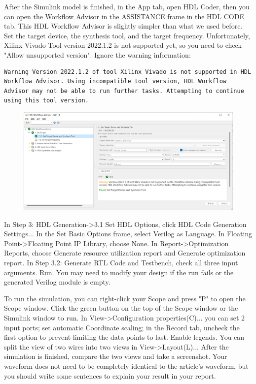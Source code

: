 \documentclass[a4paper,12pt,twoside]{article}
\begin{document}
After the Simulink model is finished, in the App tab, open HDL Coder, then you can open the Workflow Advisor in the ASSISTANCE frame in the HDL CODE tab. This HDL Workflow Advisor is slightly simpler than what we used before. Set the target device, the synthesis tool, and the target frequency. Unfortunately, Xilinx Vivado Tool version 2022.1.2 is not supported yet, so you need to check "Allow unsupported version". Ignore the warning information:
\begin{verbatim}
Warning Version 2022.1.2 of tool Xilinx Vivado is not supported in HDL Workflow Advisor. Using incompatible tool version, HDL Workflow Advisor may not be able to run further tasks. Attempting to continue using this tool version.
\end{verbatim}
\begin{figure}[H]
    \centering
    \includegraphics[width=\textwidth]{images/32.png}
\end{figure}
In Step 3: HDL Generation->3.1 Set HDL Options, click HDL Code Generation Settings... In the Set Basic Options frame, select Verilog as Language. In Floating Point->Floating Point IP Library, choose None. In Report->Optimization Reports, choose Generate resource utilization report and Generate optimization report. In Step 3.2: Generate RTL Code and Testbench, check all three input arguments. Run. You may need to modify your design if the run fails or the generated Verilog module is empty.

To run the simulation, you can right-click your Scope and press "P" to open the Scope window. Click the green button on the top of the Scope window or the Simulink window to run. In View->Configuration properties(C)... you can set 2 input ports; set automatic Coordinate scaling; in the Record tab, uncheck the first option to prevent limiting the data points to last. Enable legends. You can split the view of two wires into two views in View->Layout(L)... After the simulation is finished, compare the two views and take a screenshot. Your waveform does not need to be completely identical to the article's waveform, but you should write some sentences to explain your result in your report.
\end{document}
